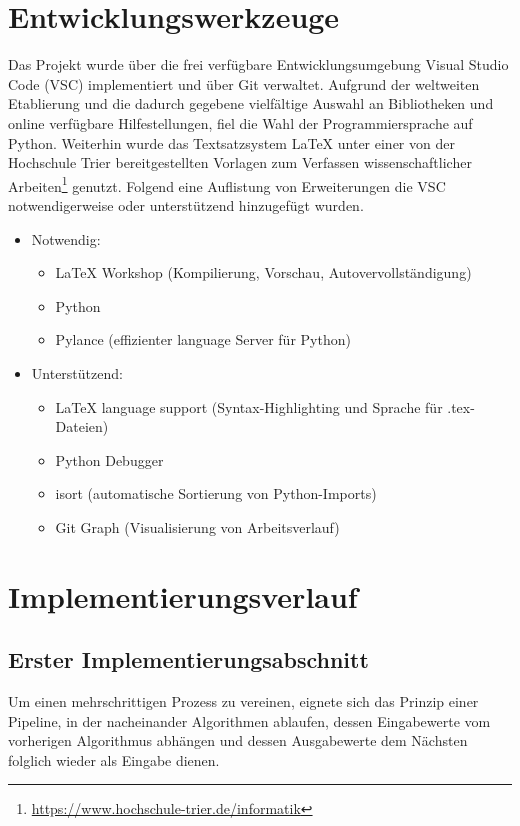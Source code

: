 \section{Entwicklungswerkzeuge}
Das Projekt wurde über die frei verfügbare Entwicklungsumgebung Visual Studio Code (VSC) implementiert und über Git verwaltet. Aufgrund der weltweiten Etablierung und die dadurch gegebene vielfältige Auswahl an Bibliotheken und online verfügbare Hilfestellungen, fiel die Wahl der Programmiersprache auf Python. Weiterhin wurde das Textsatzsystem LaTeX unter einer von der Hochschule Trier bereitgestellten Vorlagen zum Verfassen wissenschaftlicher Arbeiten\footnote{\url{https://www.hochschule-trier.de/informatik}} genutzt. Folgend eine Auflistung von Erweiterungen die VSC notwendigerweise oder unterstützend hinzugefügt wurden.
\begin{itemize}
    \item Notwendig:
        \begin{itemize}
            \item LaTeX Workshop (Kompilierung, Vorschau, Autovervollständigung)
            \item Python
            \item Pylance (effizienter language Server für Python)
        \end{itemize}
    \item Unterstützend:
        \begin{itemize}
            \item LaTeX language support (Syntax-Highlighting und Sprache für .tex-Dateien)
            \item Python Debugger
            \item isort (automatische Sortierung von Python-Imports)
            \item Git Graph (Visualisierung von Arbeitsverlauf)
        \end{itemize}
\end{itemize}


\section{Implementierungsverlauf}
\subsection{Erster Implementierungsabschnitt}
Um einen mehrschrittigen Prozess zu vereinen, eignete sich das Prinzip einer Pipeline, in der nacheinander Algorithmen ablaufen, dessen Eingabewerte vom vorherigen Algorithmus abhängen und dessen Ausgabewerte dem Nächsten folglich wieder als Eingabe dienen.


